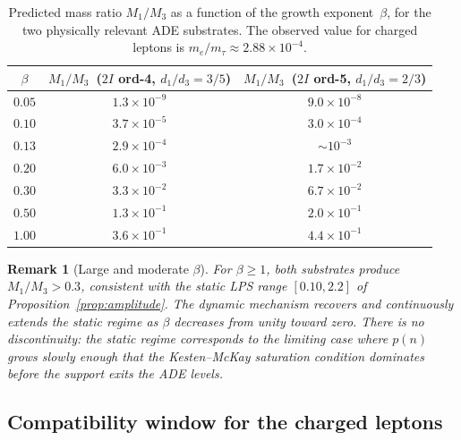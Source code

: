 \documentclass[11pt,a4paper]{article}
\newtheorem{remark}[theorem]{Remark}
\begin{document}
      \begin{table}[ht]
        \centering
        \caption{%
          Predicted mass ratio $M_1/M_3$ as a function of the growth exponent~$\beta$,
          for the two physically relevant ADE substrates.
          The observed value for charged leptons is
          $m_e/m_\tau \approx 2.88 \times 10^{-4}$.%
        }
        \label{tab:ratios}
        \smallskip
        \begin{tabular}{ccc}
          \toprule
          $\beta$ &
          $M_1/M_3$\ ($2I$ ord-4, $d_1/d_3 = 3/5$) &
          $M_1/M_3$\ ($2I$ ord-5, $d_1/d_3 = 2/3$) \\
          \midrule
          $0.05$ & $1.3 \times 10^{-9}$ & $9.0 \times 10^{-8}$ \\
          $0.10$ & $3.7 \times 10^{-5}$ & $3.0 \times 10^{-4}$ \\
          $0.13$ & $2.9 \times 10^{-4}$ & $\sim 10^{-3}$       \\
          $0.20$ & $6.0 \times 10^{-3}$ & $1.7 \times 10^{-2}$ \\
          $0.30$ & $3.3 \times 10^{-2}$ & $6.7 \times 10^{-2}$ \\
          $0.50$ & $1.3 \times 10^{-1}$ & $2.0 \times 10^{-1}$ \\
          $1.00$ & $3.6 \times 10^{-1}$ & $4.4 \times 10^{-1}$ \\
          \bottomrule
        \end{tabular}
      \end{table}

      \begin{remark}[Large and moderate $\beta$]
        \label{rem:large-beta}
        For $\beta \geq 1$, both substrates produce $M_1/M_3 > 0.3$,
        consistent with the static LPS range $[0.10, 2.2]$ of
        Proposition~\ref{prop:amplitude}.
        The dynamic mechanism recovers and continuously extends the static regime
        as $\beta$ decreases from unity toward zero.
        There is no discontinuity: the static regime corresponds to the
        limiting case where $p(n)$ grows slowly enough that
        the Kesten--McKay saturation condition dominates before
        the support exits the ADE levels.
      \end{remark}

    \subsection{Compatibility window for the charged leptons}
      \label{subsec:window}
\end{document}
